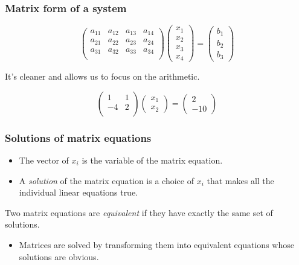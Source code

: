 \documentclass[11pt,ignorenonframetext,]{beamer}
\begin{document}
\begin{frame}\frametitle{Matrix form of a system}

\begin{equation*}
    \begin{pmatrix}
        a_{11} & a_{12} & a_{13} & a_{14} \\
        a_{21} & a_{22} & a_{23} & a_{24} \\
        a_{31} & a_{32} & a_{33} & a_{34} \\
    \end{pmatrix} \begin{pmatrix}
        x_1 \\ x_2 \\ x_3 \\ x_4
    \end{pmatrix} = \begin{pmatrix}
        b_1 \\ b_2 \\ b_3
    \end{pmatrix}
\end{equation*}

It's cleaner and allows us to focus on the arithmetic.

\begin{equation*}
    \begin{pmatrix}
        1 & 1 \\
        -4 & 2 \\ 
    \end{pmatrix} \begin{pmatrix}
        x_1 \\ x_2
    \end{pmatrix} = \begin{pmatrix}
        2 \\ -10
    \end{pmatrix}
\end{equation*}

\end{frame}

\begin{frame}\frametitle{Solutions of matrix equations}

\begin{itemize}
\itemsep1pt\parskip0pt
\item
  The vector of $x_i$ is the variable of the matrix equation.
\item
  A \emph{solution} of the matrix equation is a choice of $x_i$ that
  makes all the individual linear equations true.
\end{itemize}

Two matrix equations are \emph{equivalent} if they have exactly the same
set of solutions.

\begin{itemize}
\itemsep1pt\parskip0pt
\item
  Matrices are solved by transforming them into equivalent equations
  whose solutions are obvious.
\end{itemize}

\end{frame}
\end{document}
